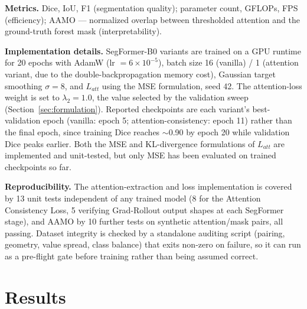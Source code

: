 \documentclass[sigconf,review]{acmart}
\begin{document}
\textbf{Metrics.} Dice, IoU, F1 (segmentation quality); parameter count,
GFLOPs, FPS (efficiency); AAMO --- normalized overlap between thresholded
attention and the ground-truth forest mask (interpretability).

\textbf{Implementation details.} SegFormer-B0 variants are trained on a GPU
runtime for 20 epochs with AdamW (lr $=6{\times}10^{-5}$), batch size 16
(vanilla) / 1 (attention variant, due to the double-backpropagation memory
cost), Gaussian target smoothing $\sigma = 8$, and $L_{att}$ using the MSE
formulation, seed 42. The attention-loss weight is set to $\lambda_2 = 1.0$,
the value selected by the validation sweep (Section~\ref{sec:formulation}).
Reported checkpoints are each variant's best-validation epoch (vanilla:
epoch 5; attention-consistency: epoch 11) rather than the final epoch, since
training Dice reaches $\sim$0.90 by epoch 20 while validation Dice peaks
earlier. Both the MSE and KL-divergence
formulations of $L_{att}$ are implemented and unit-tested, but only MSE has
been evaluated on trained checkpoints so far.

\textbf{Reproducibility.} The attention-extraction and loss implementation
is covered by 13 unit tests independent of any trained model (8 for the
Attention Consistency Loss, 5 verifying Grad-Rollout output shapes at each
SegFormer stage), and AAMO by 10 further tests on synthetic
attention/mask pairs, all passing. Dataset integrity is checked by a
standalone auditing script (pairing, geometry, value spread, class balance)
that exits non-zero on failure, so it can run as a pre-flight gate before
training rather than being assumed correct.

\section{Results}
\end{document}
